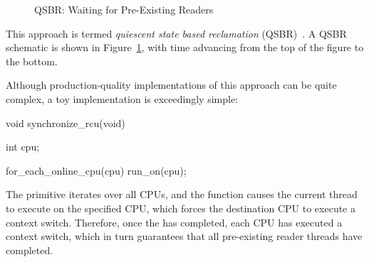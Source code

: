 \begin{figure}[tb]
\centering
{}
\caption{QSBR: Waiting for Pre-Existing Readers}
\label{fig:defer:QSBR: Waiting for Pre-Existing Readers}
\end{figure}

This approach is termed \emph{quiescent state based reclamation}
(QSBR)~\cite{ThomasEHart2006a}.
A QSBR schematic is shown in
Figure~\ref{fig:defer:QSBR: Waiting for Pre-Existing Readers},
with time advancing from the top of the figure to the bottom.

Although production-quality implementations of this approach can be
quite complex, a toy implementation is exceedingly simple:

\begin{VerbatimN}[samepage=true]
void synchronize_rcu(void)
{
	int cpu;

	for_each_online_cpu(cpu)
		run_on(cpu);
}
\end{VerbatimN}

The  primitive iterates over all CPUs, and
the  function causes the current thread to execute on the
specified CPU, which forces the destination CPU to execute a context
switch.
Therefore, once the  has completed, each CPU
has executed a context switch, which in turn guarantees that
all pre-existing reader threads have completed.

